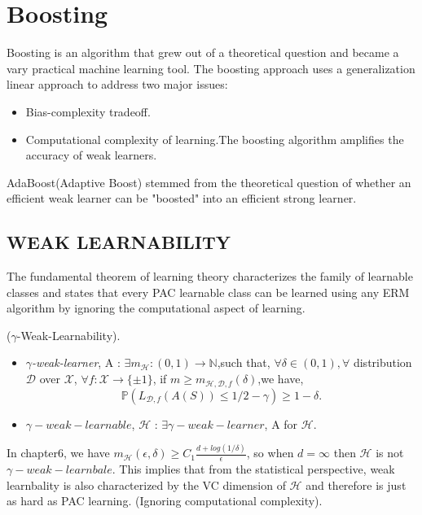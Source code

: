 \section{Boosting}

Boosting is an algorithm that grew out of a theoretical question and became a vary practical
machine learning tool. The boosting approach uses a generalization linear approach to address
two major issues:
\begin{itemize}
	\item Bias-complexity tradeoff.
	\item Computational complexity of learning.The boosting algorithm amplifies the accuracy
		of weak learners.
\end{itemize}

AdaBoost(Adaptive Boost) stemmed from the theoretical question of whether an efficient weak
learner can be "boosted" into an efficient strong learner.

\subsection{WEAK LEARNABILITY}

The fundamental theorem of learning theory characterizes the family of learnable classes and
states that every PAC learnable class can be learned using any ERM algorithm by ignoring
the computational aspect of learning.

\begin{defn}
	($\gamma$-Weak-Learnability).\\
	\begin{itemize}
		\item \emph{$\gamma$-weak-learner}, A : 
			$\exists m_\mathcal{H}:(0,1)\rightarrow\mathbb{N}$,such that,
			$\forall \delta \in (0,1), \forall$ distribution $\mathcal{D}$ over $\mathcal{X}$,
			$\forall f:\mathcal{X}\rightarrow\{ \pm 1 \}$,
			if $m \ge m_{\mathcal{H,D},f}(\delta)$,we have,
			\[
					\mathbb{P}(L_{\mathcal{D},f}(A(S)) \le 1/2-\gamma) \ge 1-\delta
			.\]
		\item $\gamma-weak-learnable$, $\mathcal{H}$ :
			$\exists \gamma-weak-learner$, A for $\mathcal{H}$.
	\end{itemize}
\end{defn}

In chapter6, we have $m_\mathcal{H}(\epsilon, \delta) \ge C_1\frac{d+log(1/\delta)}{\epsilon}$,
so when $d=\infty$ then $\mathcal{H}$ is not $\gamma-weak-learnbale$.
This implies that from the statistical perspective, weak learnbality is also characterized
by the VC dimension of $\mathcal{H}$ and therefore is just as hard as PAC learning.
(Ignoring computational complexity).

